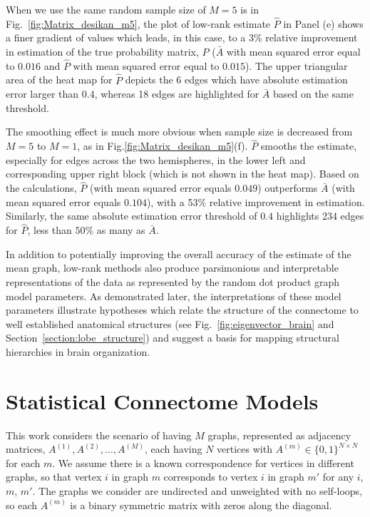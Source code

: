 \documentclass[journal,twoside,web]{ieeecolor}
\begin{document}
When we use the same random sample size of $M=5$ is in Fig.~\ref{fig:Matrix_desikan_m5}, the plot of low-rank estimate $\hat{P}$ in Panel (e) shows a finer gradient of values which leads, in this case, to a 3\% relative improvement in estimation of the true probability matrix, $P$ ($\bar{A}$ with mean squared error equal to $0.016$ and $\hat{P}$ with mean squared error equal to $0.015$).
The upper triangular area of the heat map for $\hat{P}$ depicts the 6 edges which have absolute estimation error larger than $0.4$, whereas 18 edges are highlighted for $\bar{A}$ based on the same threshold.

The smoothing effect is much more obvious when sample size is decreased from $M = 5$ to $M = 1$, as  in Fig.\ref{fig:Matrix_desikan_m5}(f). $\hat{P}$ smooths the estimate, especially for edges across the two hemispheres, in the lower left and corresponding upper right block (which is not shown in the heat map).
Based on the calculations, $\hat{P}$ (with mean squared error equals $0.049$) outperforms $\bar{A}$ (with mean squared error equals $0.104$), with a 53\% relative improvement in estimation.
Similarly, the same absolute estimation error threshold of $0.4$ highlights 234 edges for $\hat{P}$, less than $50\%$ as many as $\bar{A}$.

In addition to potentially improving the overall accuracy of the estimate of the mean graph, low-rank methods also produce parsimonious and interpretable representations of the data as represented by the random dot product graph model parameters.
As demonstrated later, the interpretations of these model parameters illustrate hypotheses which relate the structure of the connectome to well established anatomical structures (see Fig.~\ref{fig:eigenvector_brain} and Section~\ref{section:lobe_structure}) and suggest a basis for mapping structural hierarchies in brain organization.


\section{Statistical Connectome Models}
\label{section:model}



This work considers the scenario of having $M$ graphs, represented as adjacency matrices, $A^{(1)},A^{(2)},\dotsc,A^{(M)}$, each having $N$ vertices with $A^{(m)}\in\{0,1\}^{N\times N}$ for each $m$.
We assume there is a known correspondence for vertices in different graphs, so that vertex $i$ in graph $m$ corresponds to vertex $i$ in graph $m'$ for any  $i$, $m$, $m'$.
The graphs we consider are undirected and unweighted with no self-loops, so each $A^{(m)}$ is a binary symmetric matrix with zeros along the diagonal.
\end{document}
